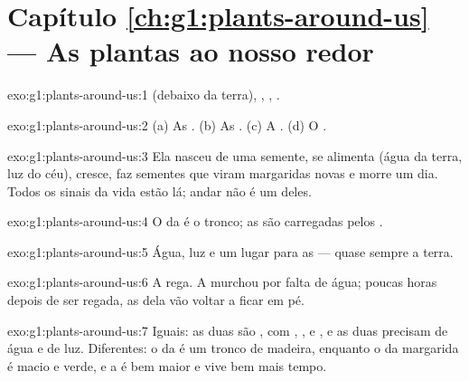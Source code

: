 \section*{Capítulo \ref{ch:g1:plants-around-us} --- As plantas ao nosso redor}

\begin{solution}{exo:g1:plants-around-us:1}
 (debaixo da terra), , , .
\end{solution}

\begin{solution}{exo:g1:plants-around-us:2}
(a) As . (b) As . (c) A . (d) O .
\end{solution}

\begin{solution}{exo:g1:plants-around-us:3}
Ela nasceu de uma semente, se alimenta (água da terra, luz do céu),
cresce, faz sementes que viram margaridas novas e morre um dia.
Todos os sinais da vida estão lá; andar não é um deles.
\end{solution}

\begin{solution}{exo:g1:plants-around-us:4}
O  da  é o tronco; as  são carregadas pelos .
\end{solution}

\begin{solution}{exo:g1:plants-around-us:5}
Água, luz e um lugar para as  --- quase sempre a terra.
\end{solution}

\begin{solution}{exo:g1:plants-around-us:6}
A rega. A  murchou por falta de água; poucas horas depois de
ser regada, as  dela vão voltar a ficar em pé.
\end{solution}

\begin{solution}{exo:g1:plants-around-us:7}
Iguais: as duas são , com , ,  e , e
as duas precisam de água e de luz. Diferentes: o  da  é
um tronco de madeira, enquanto o  da margarida é macio e verde,
e a  é bem maior e vive bem mais tempo.
\end{solution}

